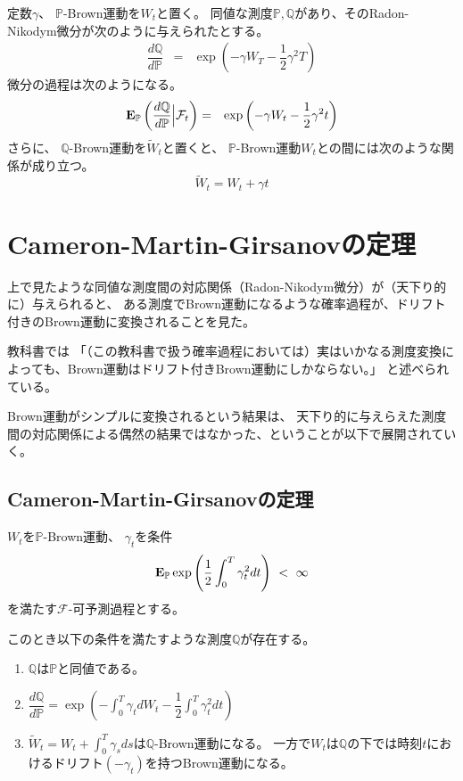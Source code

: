 \documentclass[uplatex,a4j,12pt,dvipdfmx]{jsarticle}
\begin{document}

定数$\gamma$、
$\mathbb{P}$-Brown運動を$W_{t}$と置く。
同値な測度$\mathbb{P},\mathbb{Q}$があり、そのRadon-Nikodym微分が次のように与えられたとする。
%
\begin{eqnarray*}
	\dfrac{ d \mathbb{Q} }{ d \mathbb{P} }
	&=&
	\exp \left( - \gamma W_{T} - \dfrac{1}{2} \gamma^{2} T \right)
\end{eqnarray*}
%
微分の過程は次のようになる。
%
\begin{eqnarray*}
	{\bf E}_{\mathbb{P}}
	\left( \dfrac{ d \mathbb{Q} }{ d \mathbb{P} } \Big| \mathcal{F}_{t} \right)
	&=&
	\exp \left( - \gamma W_{t} - \dfrac{1}{2} \gamma^{2} t \right)
\end{eqnarray*}
%
さらに、
$\mathbb{Q}$-Brown運動を$\tilde{W}_{t}$と置くと、
$\mathbb{P}$-Brown運動$W_{t}$との間には次のような関係が成り立つ。
$$
	\tilde{W}_{t} = W_{t} + \gamma t
$$
\section{Cameron-Martin-Girsanovの定理}

上で見たような同値な測度間の対応関係（Radon-Nikodym微分）が（天下り的に）与えられると、
ある測度でBrown運動になるような確率過程が、ドリフト付きのBrown運動に変換されることを見た。

教科書では
「（この教科書で扱う確率過程においては）実はいかなる測度変換によっても、Brown運動はドリフト付きBrown運動にしかならない。」
と述べられている。

Brown運動がシンプルに変換されるという結果は、
天下り的に与えらえた測度間の対応関係による偶然の結果ではなかった、ということが以下で展開されていく。

\subsection{Cameron-Martin-Girsanovの定理}

$W_{t}$を$\mathbb{P}$-Brown運動、
$\gamma_{t}$を条件
$$
	{\bf E}_{\mathbb{P}} \exp \left( \dfrac{1}{2} \int^{T}_{0} \gamma_{t}^{2} dt \right)
	\ < \
	\infty
$$
を満たす$\mathcal{F}$-可予測過程とする。

このとき以下の条件を満たすような測度$\mathbb{Q}$が存在する。

\begin{enumerate}
	\item $\mathbb{Q}$は$\mathbb{P}$と同値である。
	\item $\displaystyle \dfrac{ d \mathbb{Q} }{ d \mathbb{P} } = \exp \left( - \int^{T}_{0} \gamma_{t} dW_{t} - \dfrac{1}{2} \int^{T}_{0} \gamma_{t}^{2} dt \right)$
	\item $\displaystyle \tilde{W}_{t} = W_{t} + \int^{T}_{0} \gamma_{s} ds$は$\mathbb{Q}$-Brown運動になる。
	      一方で$W_{t}$は$\mathbb{Q}$の下では時刻$t$におけるドリフト$(- \gamma_{t})$を持つBrown運動になる。
\end{enumerate}
\end{document}
